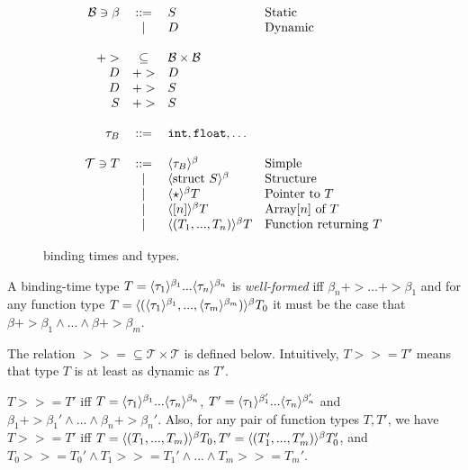 \begin{docpart}
\begin{figure*}%
\begin{frameit}
\[\begin{array}{rcll}
  {\mathcal B} \ni \beta &::=& S & \mbox{Static} \\
                         & | & D & \mbox{Dynamic}\\
  \\
  +> &\subseteq& {\mathcal B} \times {\mathcal B} \\
  D & +> & D \\
  D & +> & S \\
  S & +> & S \\
  \\
    \tau_B &::=& \texttt{int}, \texttt{float}, \dots \\
  \\
  {\mathcal T} \ni T &::=& \langle{\tau_B}\rangle^{\beta} & \mbox{Simple} \\
            & | & \langle{\mbox{struct }S}\rangle^{\beta} & \mbox{Structure}  \\
            & | & \langle{\star}\rangle^{\beta} T  & \mbox{Pointer to }T \\
            & | & \langle{[n]}\rangle^{\beta} T  & \mbox{Array}[n]\mbox{ of }T \\
            & | & \langle{(T_1,...,T_n)}\rangle^{\beta} T  & \mbox{Function
                         returning }T \\
\end{array}\]
\caption{binding times and types.}
\label{fig:btt}
\end{frameit}
\end{figure*}

\begin{Def}
  \label{def:wf-bttype}
  A binding-time type $T =
  \langle{\tau_1}\rangle^{\beta_1}...\langle{\tau_n}\rangle^{\beta_n}$ is \emph{well-formed}
  iff $\beta_n +> \dots +> \beta_1$ and for any function type $T =
  \langle{(\langle{\tau_1}\rangle^{\beta_1},...,\langle{\tau_m}\rangle^{\beta_m} )}\rangle^{\beta} T_0$
  it must be the case that $\beta +> \beta_1 \wedge ... \wedge \beta
  +> \beta_m$.
\end{Def}

\noindent
The relation ${>>=} \subseteq \mathcal{T} \times \mathcal{T}$ is
defined below. Intuitively, $T >>= T'$ means that type $T$ is at least
as dynamic as $T'$.

\begin{Def}
  \label{def:bt-type-order}
  $T >>= T'$ iff $T = \langle{\tau_1}\rangle^{\beta_1}...\langle{\tau_n}\rangle^{\beta_n}$,
  $T' = \langle{\tau_1}\rangle^{\beta_1'}...\langle{\tau_n}\rangle^{\beta_n'}$ and $\beta_1
  +> \beta_1' \wedge ... \wedge \beta_n +> \beta_n'$. Also, for any
  pair of function types $T,T'$, we have $T >>= T'$ iff $T =
  \langle{(T_1,...,T_m)}\rangle^{\beta}T_0, T' =
  \langle{(T_1',...,T_m')}\rangle^{\beta}T_0'$, and $T_0 >>= T_0' \wedge T_1 >>=
  T_1' \wedge ... \wedge T_m >>= T_m'$.
\end{Def}


\end{docpart}
